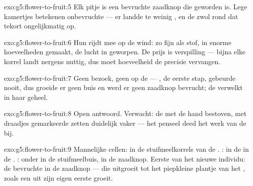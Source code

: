 \begin{solution}{exo:g5:flower-to-fruit:5}
Elk pitje is een bevruchte zaadknop die  geworden is. Lege
kamertjes betekenen onbevruchte  --- er landde te weinig
, en de  zwol rond dat tekort ongelijkmatig op.
\end{solution}

\begin{solution}{exo:g5:flower-to-fruit:6}
Hun  rijdt mee op de wind: zo fijn als stof, in enorme
hoeveelheden gemaakt, de lucht in geworpen. De prijs is verspilling ---
bijna elke korrel landt nergens nuttig, dus moet hoeveelheid de precisie
vervangen.
\end{solution}

\begin{solution}{exo:g5:flower-to-fruit:7}
Geen bezoek, geen  op de  --- , de eerste
stap, gebeurde nooit, dus groeide er geen buis en werd er geen zaadknop
bevrucht; de  verwelkt in haar geheel.
\end{solution}

\begin{solution}{exo:g5:flower-to-fruit:8}
Open antwoord. Verwacht: de met de hand bestoven, met draadjes
gemarkeerde  zetten duidelijk vaker  --- het penseel deed
het werk van de bij.
\end{solution}

\begin{solution}{exo:g5:flower-to-fruit:9}
Mannelijke cellen: in de stuifmeelkorrels van de . :
in de  in de . : onder in de stuifmeelbuis,
in de zaadknop. Eerste  van het nieuwe individu: de bevruchte 
in de zaadknop --- die uitgroeit tot het piepkleine plantje van het
, zoals een  uit zijn eigen eerste  groeit.
\end{solution}

